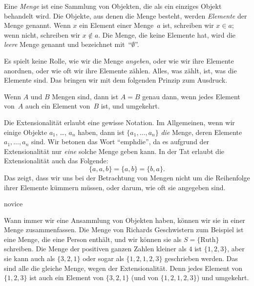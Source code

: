 \documentclass[../../../include/open-logic-section]{subfiles}
\begin{document}

Eine \emph{Menge} ist eine Sammlung von Objekten, die als ein einziges
Objekt behandelt wird. Die Objekte, aus denen die Menge besteht, werden \emph{Elemente} der Menge genannt. Wenn $x$ ein Element 
einer Menge~$a$ ist, schreiben wir $x \in a$; wenn nicht, schreiben wir $x \notin a$. Die Menge, die keine
Elemente hat, wird die \emph{leere} Menge genannt und
bezeichnet mit~``$\emptyset$''.

\begin{explain}
Es spielt keine Rolle, wie wir die Menge \emph{angeben}, oder wie wir
ihre Elemente anordnen, oder wie oft wir ihre Elemente zählen. Alles, was zählt, ist, was die Elemente
sind. Das bringen wir mit dem folgenden Prinzip zum Ausdruck.
\end{explain}

\begin{defn}[Extensionalität]
  Wenn $A$ und $B$ Mengen sind, dann ist $A = B$ genau dann, wenn
  jedes Element von~$A$ auch ein Element von~$B$ ist, und umgekehrt.
\end{defn}

Die Extensionalität erlaubt eine gewisse Notation. Im Allgemeinen, wenn wir einige
Objekte $a_{1}$, \dots, $a_{n}$ haben, dann ist $\{a_{1}, \dots, a_{n}\}$
\emph{die} Menge, deren Elemente $a_1, \dots, a_n$ sind. Wir betonen das Wort ``emph{die}'', da es aufgrund der Extensionalität
nur \emph{eine} solche Menge geben kann. In der Tat erlaubt die Extensionalität auch das
Folgende:
  \[
    \{a, a, b\} = \{a, b\} = \{b,a\}.
  \] 
Das zeigt, dass wir uns bei der Betrachtung von Mengen nicht um die Reihenfolge ihrer Elemente kümmern müssen, oder darum, wie oft sie angegeben sind.

\begin{tagblock}{novice}
\begin{ex}
Wann immer wir eine Ansammlung von Objekten haben, können wir sie in einer Menge zusammenfassen.
 Die Menge von Richards Geschwistern zum Beispiel ist eine Menge, die
eine Person enthält, und wir können sie als $S=\{\textrm{Ruth}\}$ schreiben.
Die Menge der positiven ganzen Zahlen kleiner als $4$ ist $\{1, 2, 3\}$, aber sie
kann auch als $\{3, 2, 1\}$ oder sogar als $\{1, 2, 1, 2, 3\}$ geschrieben werden.
Das sind alle die gleiche Menge, wegen der Extensionalität. Denn jedes Element
von $\{1, 2, 3\}$ ist auch ein Element von $\{3, 2, 1\}$ (und von $\{1,
2, 1, 2, 3\}$) und umgekehrt.
\end{ex} 
\end{tagblock}
\end{document}
